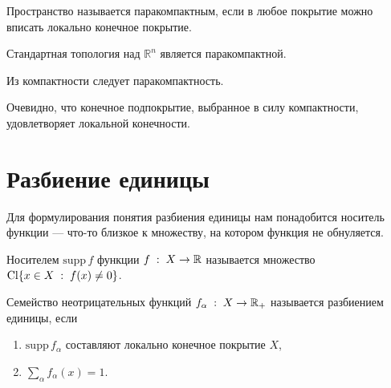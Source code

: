 \begin{Def}
    Пространство \topX называется паракомпактным, если в любое покрытие можно вписать локально конечное покрытие.
\end{Def}

\begin{Ex}
    Стандартная топология над $\mathbb{R}^n$ является паракомпактной.
\end{Ex}

\begin{Prop}
    Из компактности следует паракомпактность.
\end{Prop}
\begin{Proof}
    Очевидно, что конечное подпокрытие, выбранное в силу компактности, удовлетворяет локальной конечности.
\end{Proof}

\section{Разбиение единицы}
Для формулирования понятия разбиения единицы нам понадобится носитель функции --- что-то близкое к множеству, на котором функция не обнуляется.
\begin{Def}
    Носителем $\mathrm{supp}\,f$ функции $f\; : \; X \to \mathbb{R}$ называется множество $\mathrm{Cl} \{x\in X \; : \; f(x) \neq 0\}$.
\end{Def}

\begin{Def}
    Семейство неотрицательных функций $f_\alpha\; : \; X \to \mathbb{R}_+$ называется разбиением единицы, если
    \begin{enumerate}
        \item $\mathrm{supp}\, f_\alpha$ составляют локально конечное покрытие $X$,
        \item $\sum\limits_{\alpha} f_\alpha(x) = 1$.
    \end{enumerate}
\end{Def}
